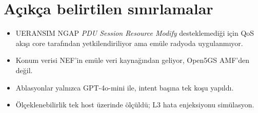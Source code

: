 \documentclass[10pt,a4paper]{article}
\begin{document}
\section{Açıkça belirtilen sınırlamalar}
\begin{itemize}
\item UERANSIM NGAP \textit{PDU Session Resource Modify} desteklemediği için QoS akışı core tarafından
yetkilendiriliyor ama emüle radyoda uygulanmıyor.
\item Konum verisi NEF'in emüle veri kaynağından geliyor, Open5GS AMF'den değil.
\item Ablasyonlar yalnızca GPT-4o-mini ile, intent başına tek koşu yapıldı.
\item Ölçeklenebilirlik tek host üzerinde ölçüldü; L3 hata enjeksiyonu simülasyon.
\end{itemize}
\end{document}
